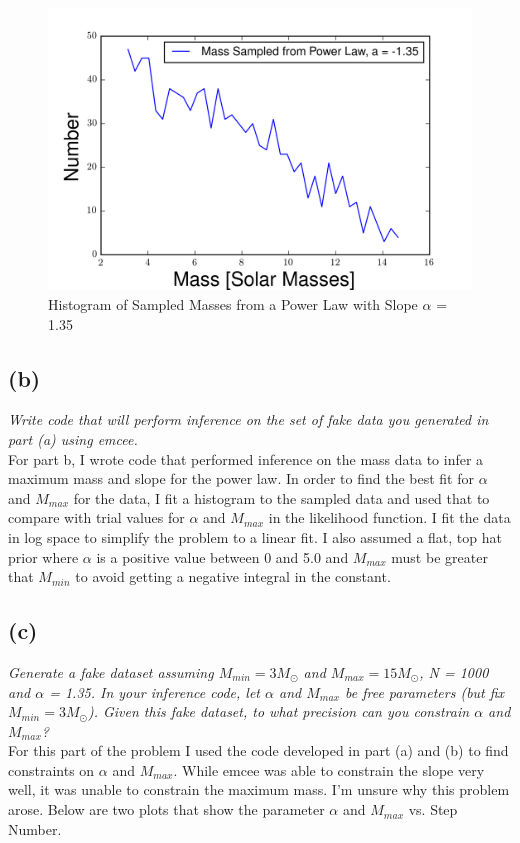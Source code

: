 \documentclass[english,11pt]{article}
\begin{document}
\begin{figure}[H]
\centering
\caption{Histogram of Sampled Masses from a Power Law with Slope $\alpha$ = 1.35}
\includegraphics[scale = 0.6]{mass_histogram_prob2.png}
\end{figure}

\subsection*{(b)}
\textit{Write code that will perform inference on the set of fake data you generated in part (a) using emcee.}\\
For part b, I wrote code that performed inference on the mass data to infer a maximum mass and slope for the power law. In order to find the best fit for $\alpha$ and $M_{max}$ for the data, I fit a histogram to the sampled data and used that to compare with trial values for $\alpha$ and $M_{max}$ in the likelihood function.  I fit the data in log space to simplify the problem to a linear fit. I also assumed a flat, top hat prior where $\alpha$  is a positive value between 0 and 5.0 and $M_{max}$ must be greater that $M_{min}$ to avoid getting a negative integral in the constant.

\subsection*{(c)}
\textit{Generate a fake dataset assuming $M_{min} = 3 M_{\odot}$ and $M_{max} = 15 M_{\odot}$, N = 1000 and $\alpha$ = 1.35. In your inference code, let $\alpha$ and $M_{max}$ be free parameters (but fix $M_{min} = 3 M_{\odot}$). Given this fake dataset, to what precision can you constrain $\alpha$ and $M_{max}$? }\\
For this part of the problem I used the code developed in part (a) and (b) to find constraints on  $\alpha$ and $M_{max}$. While emcee was able to constrain the slope very well, it was unable to constrain the maximum mass. I'm unsure why this problem arose. Below are two plots that show the parameter $\alpha$ and $M_{max}$ vs. Step Number.
\end{document}
